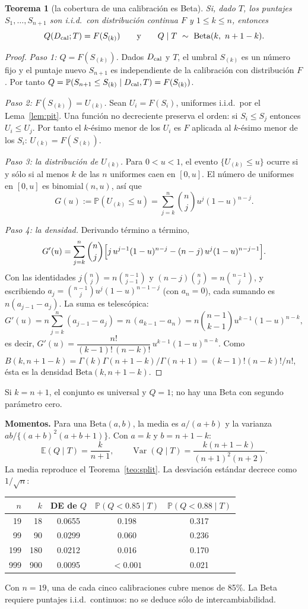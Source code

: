 \documentclass[11pt]{article}
\theoremstyle{plain}
\newtheorem{teorema}{Teorema}[section]
\theoremstyle{definition}
\theoremstyle{remark}
\newcommand{\Prob}{\mathbb P}
\newcommand{\E}{\mathbb E}
\newcommand{\Var}{\operatorname{Var}}
\newcommand{\dest}[1]{\par\needspace{4\baselineskip}\textbf{#1}\quad}
\begin{document}
\begin{teorema}[la cobertura de una calibración es Beta]\label{teo:beta}
Si, dado $T$, los puntajes $S_1,\dots,S_{n+1}$ son i.i.d.\ con distribución continua $F$ y $1\le k\le
n$, entonces
\[
 Q(D_{\rm cal};T)=F(S_{(k)})\qquad\text{y}\qquad Q\mid T\ \sim\ \mathrm{Beta}(k,\ n+1-k).
\]
\end{teorema}
\begin{proof}
\emph{Paso 1: $Q=F(S_{(k)})$.} Dados $D_{\rm cal}$ y $T$, el umbral $S_{(k)}$ es un número fijo y el
puntaje nuevo $S_{n+1}$ es independiente de la calibración con distribución $F$. Por tanto
$Q=\Prob(S_{n+1}\le S_{(k)}\mid D_{\rm cal},T)=F(S_{(k)})$.

\emph{Paso 2: $F(S_{(k)})=U_{(k)}$.} Sean $U_i=F(S_i)$, uniformes i.i.d.\ por el
Lema~\ref{lem:pit}. Una función no decreciente preserva el orden: si $S_i\le S_j$ entonces $U_i\le
U_j$. Por tanto el $k$-ésimo menor de los $U_i$ es $F$ aplicada al $k$-ésimo menor de los $S_i$:
$U_{(k)}=F(S_{(k)})$.

\emph{Paso 3: la distribución de $U_{(k)}$.} Para $0<u<1$, el evento $\{U_{(k)}\le u\}$ ocurre si y
sólo si al menos $k$ de las $n$ uniformes caen en $[0,u]$. El número de uniformes en $[0,u]$ es
binomial$(n,u)$, así que
\[
 G(u):=\Prob(U_{(k)}\le u)=\sum_{j=k}^{n}\binom nj u^j(1-u)^{n-j}.
\]

\emph{Paso 4: la densidad.} Derivando término a término,
\[
 G'(u)=\sum_{j=k}^{n}\binom nj\Bigl[j\,u^{j-1}(1-u)^{n-j}-(n-j)\,u^j(1-u)^{n-j-1}\Bigr].
\]
Con las identidades $j\binom nj=n\binom{n-1}{j-1}$ y $(n-j)\binom nj=n\binom{n-1}{j}$, y escribiendo
$a_j=\binom{n-1}{j}u^j(1-u)^{n-1-j}$ (con $a_n=0$), cada sumando es $n(a_{j-1}-a_j)$. La suma es
telescópica:
\[
 G'(u)=n\sum_{j=k}^{n}(a_{j-1}-a_j)=n\,(a_{k-1}-a_n)=n\binom{n-1}{k-1}u^{k-1}(1-u)^{n-k},
\]
es decir, $G'(u)=\dfrac{n!}{(k-1)!\,(n-k)!}\,u^{k-1}(1-u)^{n-k}$. Como
$B(k,n+1-k)=\Gamma(k)\Gamma(n+1-k)/\Gamma(n+1)=(k-1)!(n-k)!/n!$, ésta es la densidad
$\mathrm{Beta}(k,n+1-k)$.
\end{proof}
Si $k=n+1$, el conjunto es universal y $Q=1$; no hay una Beta con segundo parámetro cero.

\dest{Momentos.} Para una $\mathrm{Beta}(a,b)$, la media es $a/(a+b)$ y la varianza
$ab/\{(a+b)^2(a+b+1)\}$. Con $a=k$ y $b=n+1-k$:
\[
 \E(Q\mid T)=\frac{k}{n+1},\qquad\Var(Q\mid T)=\frac{k(n+1-k)}{(n+1)^2(n+2)}.
\]
La media reproduce el Teorema~\ref{teo:split}. La desviación estándar decrece como $1/\sqrt n$:
\begin{center}
\begin{tabular}{rrccc}
\toprule
$n$&$k$&DE de $Q$&$\Prob(Q<0.85\mid T)$&$\Prob(Q<0.88\mid T)$\\
\midrule
19&18&0.0655&0.198&0.317\\
99&90&0.0299&0.060&0.236\\
199&180&0.0212&0.016&0.170\\
999&900&0.0095&$<0.001$&0.021\\
\bottomrule
\end{tabular}
\end{center}
Con $n=19$, una de cada cinco calibraciones cubre menos de 85\%. La Beta requiere puntajes i.i.d.\
continuos: no se deduce sólo de intercambiabilidad.
\end{document}
